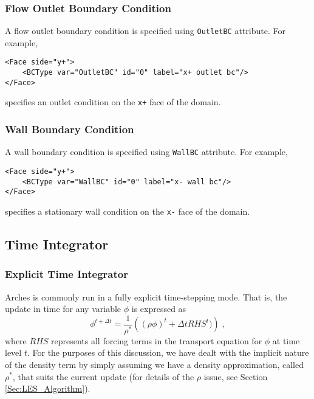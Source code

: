 \subsubsection*{Flow Outlet Boundary Condition}
%
A flow outlet boundary condition is specified using \verb=OutletBC= attribute.  For example, 
%
\begin{Verbatim}[fontsize=\footnotesize]
<Face side="y+">
	<BCType var="OutletBC" id="0" label="x+ outlet bc"/>
</Face>
\end{Verbatim}
%
specifies an outlet condition on the \verb=x+= face of the domain. 
%

\subsubsection*{Wall Boundary Condition}
%
A wall boundary condition is specified using \verb=WallBC= attribute.  For example, 
%
\begin{Verbatim}[fontsize=\footnotesize]
<Face side="y+">
	<BCType var="WallBC" id="0" label="x- wall bc"/>
</Face>
\end{Verbatim}
specifies a stationary wall condition on the \verb=x-= face of the domain. 
%

 \subsection{Time Integrator}
 \subsubsection{Explicit Time Integrator}
 Arches is commonly run in a fully explicit time-stepping mode.  That is, the update in time for any variable $\phi$ is expressed as
 \begin{equation}
 \phi^{t+\Delta t} = \frac{1}{\rho^*}\left( (\rho\phi)^t +  \Delta tRHS^t) \right) \;,
 \end{equation}
where  $RHS$ represents all forcing terms in the transport equation for $\phi$ at time level $t$.  For the purposes of this discussion, we have dealt with the implicit nature of the density term by simply assuming we have a density approximation, called $\rho^*$, that suits the current update (for details of the $\rho$ issue, see Section  \ref{Sec:LES_Algorithm}).  

